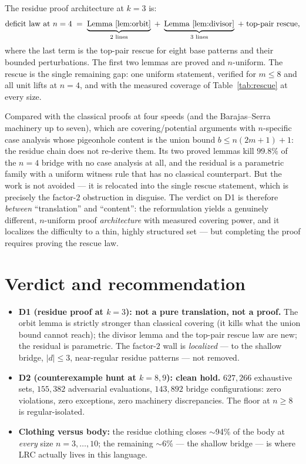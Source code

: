 \documentclass[11pt,a4paper]{article}
\theoremstyle{plain}
\theoremstyle{definition}
\theoremstyle{remark}
\begin{document}
The residue proof architecture at $k = 3$ is:
\[
\text{deficit law at } n = 4
\;=\; \underbrace{\text{Lemma~\ref{lem:orbit}}}_{2 \text{ lines}}
\;+\; \underbrace{\text{Lemma~\ref{lem:divisor}}}_{3 \text{ lines}}
\;+\; \text{top-pair rescue,}
\]
where the last term is the top-pair rescue for eight base patterns and their bounded
perturbations.
The first two lemmas are proved and $n$-uniform. The rescue is the single remaining gap:
one uniform statement, verified for $m \le 8$ and all unit lifts at $n = 4$, and with
the measured coverage of Table~\ref{tab:rescue} at every size.

Compared with the classical proofs at four speeds (and the Barajas--Serra machinery up
to seven), which are covering/potential arguments with $n$-specific case analysis whose
pigeonhole content is the union bound $b \le n(2m+1)+1$: the residue chain does not
re-derive them. Its two proved lemmas kill $99.8\%$ of the $n = 4$ bridge with no case
analysis at all, and the residual is a parametric family with a uniform witness rule
that has no classical counterpart. But the work is not avoided --- it is relocated into
the single rescue statement, which is precisely the factor-$2$ obstruction in disguise.
The verdict on D1 is therefore \emph{between} ``translation'' and ``content'': the
reformulation yields a genuinely different, $n$-uniform proof \emph{architecture} with
measured covering power, and it localizes the difficulty to a thin, highly structured
set --- but completing the proof requires proving the rescue law.

\section{Verdict and recommendation}\label{sec:verdict}

\begin{itemize}[leftmargin=*]
\item \textbf{D1 (residue proof at $k=3$): not a pure translation, not a proof.} The
orbit lemma is strictly stronger than classical covering (it kills what the union bound
cannot reach); the divisor lemma and the top-pair rescue law are new; the residual is
parametric. The factor-$2$ wall is \emph{localized} --- to the shallow bridge,
$|d| \le 3$, near-regular residue patterns --- not removed.
\item \textbf{D2 (counterexample hunt at $k = 8, 9$): clean hold.} $627{,}266$
exhaustive sets, $155{,}382$ adversarial evaluations, $143{,}892$ bridge
configurations: zero violations, zero exceptions, zero machinery discrepancies. The
floor at $n \ge 8$ is regular-isolated.
\item \textbf{Clothing versus body:} the residue clothing closes $\sim$94\% of the body
at \emph{every} size $n = 3, \dots, 10$; the remaining $\sim$6\% --- the shallow bridge
--- is where LRC actually lives in this language.
\end{itemize}
\end{document}

